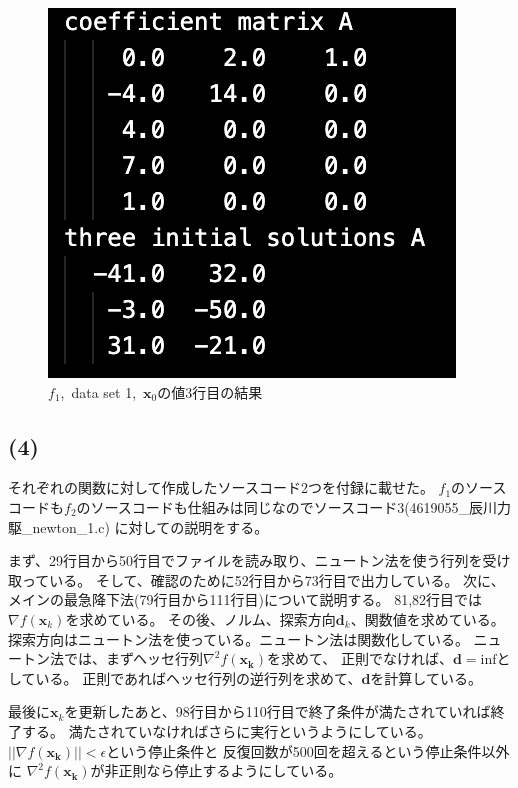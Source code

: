 \documentclass[12pt]{jarticle}
\begin{document}
\begin{figure}[h]
\begin{minipage}{0.3\hsize}
\begin{center}
        \end{center}
    \end{minipage}
    \begin{minipage}{0.3\hsize}
        \begin{center}
            \includegraphics[scale=0.4]{kadai1_2data3.png}
        \end{center}
    \end{minipage}
    \caption{$f_1$,\ data set 1,\ $\boldsymbol{x}_0$の値3行目の結果}
\end{figure}

\clearpage
\subsection*{(4)}
それぞれの関数に対して作成したソースコード2つを付録に載せた。
$f_1$のソースコードも$f_2$のソースコードも仕組みは同じなのでソースコード3(4619055\_辰川力駆\_newton\_1.c)
に対しての説明をする。

まず、29行目から50行目でファイルを読み取り、ニュートン法を使う行列を受け取っている。
そして、確認のために52行目から73行目で出力している。
次に、メインの最急降下法(79行目から111行目)について説明する。
81,82行目では$\nabla f(\boldsymbol{x}_k)$を求めている。
その後、ノルム、探索方向$\boldsymbol{d}_k$、関数値を求めている。
探索方向はニュートン法を使っている。ニュートン法は関数化している。
ニュートン法では、まずヘッセ行列$\nabla^2 f(\boldsymbol{x_k})$を求めて、
正則でなければ、$\boldsymbol{d}=\text{inf}$としている。
正則であればヘッセ行列の逆行列を求めて、$\boldsymbol{d}$を計算している。

最後に$\boldsymbol{x}_k$を更新したあと、98行目から110行目で終了条件が満たされていれば終了する。
満たされていなければさらに実行というようにしている。
$||\nabla f(\boldsymbol{x_k})||<\epsilon$という停止条件と
反復回数が500回を超えるという停止条件以外に
$\nabla^2 f(\boldsymbol{x_k})$が非正則なら停止するようにしている。
\end{document}
